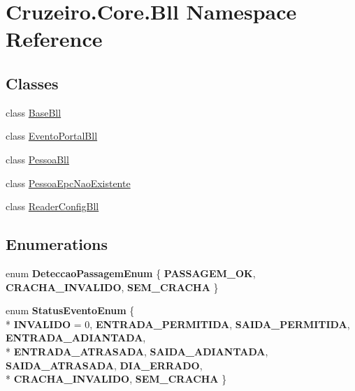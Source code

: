 \hypertarget{namespace_cruzeiro_1_1_core_1_1_bll}{}\section{Cruzeiro.\+Core.\+Bll Namespace Reference}
\label{namespace_cruzeiro_1_1_core_1_1_bll}
\subsection*{Classes}
\begin{DoxyCompactItemize}
\item 
class \hyperlink{class_cruzeiro_1_1_core_1_1_bll_1_1_base_bll}{Base\+Bll}
\item 
class \hyperlink{class_cruzeiro_1_1_core_1_1_bll_1_1_evento_portal_bll}{Evento\+Portal\+Bll}
\item 
class \hyperlink{class_cruzeiro_1_1_core_1_1_bll_1_1_pessoa_bll}{Pessoa\+Bll}
\item 
class \hyperlink{class_cruzeiro_1_1_core_1_1_bll_1_1_pessoa_epc_nao_existente}{Pessoa\+Epc\+Nao\+Existente}
\item 
class \hyperlink{class_cruzeiro_1_1_core_1_1_bll_1_1_reader_config_bll}{Reader\+Config\+Bll}
\end{DoxyCompactItemize}
\subsection*{Enumerations}
\begin{DoxyCompactItemize}
\item 
enum {\bfseries Deteccao\+Passagem\+Enum} \{ {\bfseries P\+A\+S\+S\+A\+G\+E\+M\+\_\+\+OK}, 
{\bfseries C\+R\+A\+C\+H\+A\+\_\+\+I\+N\+V\+A\+L\+I\+DO}, 
{\bfseries S\+E\+M\+\_\+\+C\+R\+A\+C\+HA}
 \}\hypertarget{namespace_cruzeiro_1_1_core_1_1_bll_a6ad6007dbc54b68d90dcc9f39e8ca39d}{}\label{namespace_cruzeiro_1_1_core_1_1_bll_a6ad6007dbc54b68d90dcc9f39e8ca39d}

\item 
enum {\bfseries Status\+Evento\+Enum} \{ \\*
{\bfseries I\+N\+V\+A\+L\+I\+DO} = 0, 
{\bfseries E\+N\+T\+R\+A\+D\+A\+\_\+\+P\+E\+R\+M\+I\+T\+I\+DA}, 
{\bfseries S\+A\+I\+D\+A\+\_\+\+P\+E\+R\+M\+I\+T\+I\+DA}, 
{\bfseries E\+N\+T\+R\+A\+D\+A\+\_\+\+A\+D\+I\+A\+N\+T\+A\+DA}, 
\\*
{\bfseries E\+N\+T\+R\+A\+D\+A\+\_\+\+A\+T\+R\+A\+S\+A\+DA}, 
{\bfseries S\+A\+I\+D\+A\+\_\+\+A\+D\+I\+A\+N\+T\+A\+DA}, 
{\bfseries S\+A\+I\+D\+A\+\_\+\+A\+T\+R\+A\+S\+A\+DA}, 
{\bfseries D\+I\+A\+\_\+\+E\+R\+R\+A\+DO}, 
\\*
{\bfseries C\+R\+A\+C\+H\+A\+\_\+\+I\+N\+V\+A\+L\+I\+DO}, 
{\bfseries S\+E\+M\+\_\+\+C\+R\+A\+C\+HA}
 \}\hypertarget{namespace_cruzeiro_1_1_core_1_1_bll_a969bd26b8fe34de4ecd30ab6222c8f8d}{}\label{namespace_cruzeiro_1_1_core_1_1_bll_a969bd26b8fe34de4ecd30ab6222c8f8d}

\end{DoxyCompactItemize}
